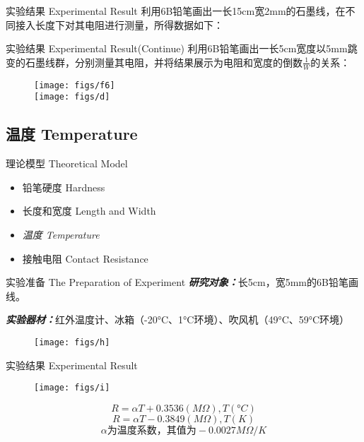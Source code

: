 \documentclass[10pt]{beamer}
\begin{document}
\begin{frame}{实验结果 Experimental Result}
利用6B铅笔画出一长15cm宽2mm的石墨线，在不同接入长度下对其电阻进行测量，所得数据如下：
	
\end{frame}


\begin{frame}{实验结果 Experimental Result(Continue)}
利用6B铅笔画出一长5cm宽度以5mm跳变的石墨线群，分别测量其电阻，并将结果展示为电阻和宽度的倒数$ \frac{1}{W} $的关系：
\begin{figure}
	\centering
	\texttt{[image: figs/f6]}\pause \\
	\texttt{[image: figs/d]}
	\label{fig:f3}
\end{figure}
\end{frame}





\subsection{温度 Temperature}
\begin{frame}{理论模型 Theoretical Model}
\begin{itemize}
		\item 铅笔硬度 Hardness
    	\item 长度和宽度 Length and Width
		\item {\LARGE \textit{温度 Temperature}}
		\item 接触电阻 Contact Resistance
\end{itemize}
\end{frame}

\begin{frame}{实验准备 The Preparation of Experiment}
	\textbf{\textit{研究对象：}}长5cm，宽5mm的6B铅笔画线。
	\bigskip
	
	\textbf{\textit{实验器材：}}红外温度计、冰箱（-20°C、1°C环境）、吹风机（49°C、59°C环境）\pause
	\begin{figure}
		\centering
		\texttt{[image: figs/h]}
	\end{figure}
\end{frame}

\begin{frame}{实验结果 Experimental Result}
\begin{figure}
	\centering
	\texttt{[image: figs/i]}
\end{figure}\pause
\begin{theorem}
	\[ R=\alpha T+0.3536(M\Omega), T(°C) \]
	\[ R=\alpha T-0.3849(M\Omega), T(K) \]
	$$ \alpha\text{为温度系数，其值为}-0.0027M\Omega /K $$

\end{theorem}
\end{frame}
\end{document}

